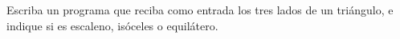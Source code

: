 Escriba un programa que reciba como entrada
los tres lados de un triángulo,
e indique si es escaleno, isóceles o equilátero.

\begin{minipage}[t]{.40\textwidth}
  
\end{minipage}
